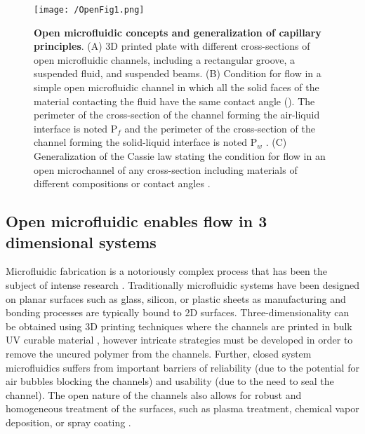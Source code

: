 \begin{figure}[h!] %
\centering
\texttt{[image: /OpenFig1.png]}
\caption[\textbf{Open microfluidic concepts and generalization of capillary principles}]{\textbf{Open microfluidic concepts and generalization of capillary principles}. (A) 3D printed plate with different cross-sections of open microfluidic channels, including a rectangular groove, a suspended fluid, and suspended beams. (B) Condition for flow in a simple open microfluidic channel in which all the solid faces of the material contacting the fluid have the same contact angle (\texttheta). The perimeter of the cross-section of the channel forming the air-liquid interface is noted P$_f$ and the perimeter of the cross-section of the channel forming the solid-liquid interface is noted P$_w$ \cite{Berthier2012SuspendedStudies}. (C) Generalization of the Cassie law stating the condition for flow in an open microchannel of any cross-section including materials of different compositions or contact angles \cite{Berthier2014AMicrochannels}.}
\label{figure:Fig1}
\end{figure}


\subsection{Open microfluidic enables flow in 3 dimensional systems}
Microfluidic fabrication is a notoriously complex process that has been the subject of intense research \cite{Zhao2015, Becker2002, Becker2000a}. Traditionally microfluidic systems have been designed on planar surfaces such as glass, silicon, or plastic sheets as manufacturing and bonding processes are typically bound to 2D surfaces. Three-dimensionality can be obtained using 3D printing techniques where the channels are printed in bulk UV curable material \cite{Au20163D-PrintedMicrofluidics}, however intricate strategies must be developed in order to remove the uncured polymer from the channels. Further, closed system microfluidics suffers from important barriers of reliability (due to the potential for air bubbles blocking the channels) and usability (due to the need to seal the channel). The open nature of the channels also allows for robust and homogeneous treatment of the surfaces, such as plasma treatment, chemical vapor deposition, or spray coating \cite{Casavant2013, Piraino2012}.


